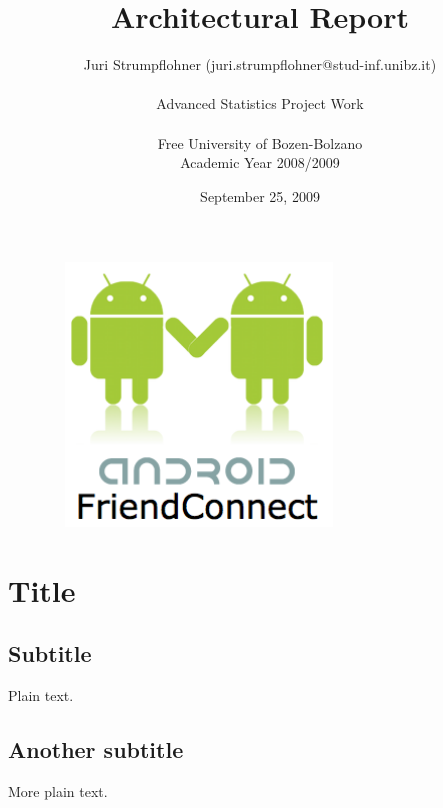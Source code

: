\documentclass{article}
\begin{document}
\begin{figure}[H]
	\begin{center}
		\includegraphics[width=8cm,height=7cm]{./imgs/AndroidLogoFull.png}
	\end{center}
\end{figure}

\title{Architectural Report\\}
\author{\small{Juri Strumpflohner (juri.strumpflohner@stud-inf.unibz.it)} 
\\ \\ \small{Advanced Statistics Project Work}
\\ \\ \small{Free University of Bozen-Bolzano}
\\ \small{Academic Year 2008/2009}
}
\date{September 25, 2009}

\maketitle

\section{Title}

\subsection{Subtitle}

Plain text.

\subsection{Another subtitle}

More plain text.
\end{document}
